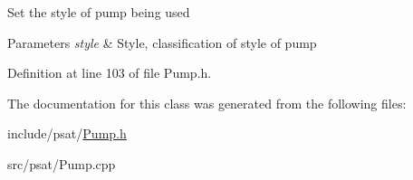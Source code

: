 Set the style of pump being used


\begin{DoxyParams}{Parameters}
{\em style} & Style, classification of style of pump \\
\hline
\end{DoxyParams}


Definition at line 103 of file Pump.\+h.



The documentation for this class was generated from the following files\+:\begin{DoxyCompactItemize}
\item 
include/psat/\hyperlink{_pump_8h}{Pump.\+h}\item 
src/psat/Pump.\+cpp\end{DoxyCompactItemize}

